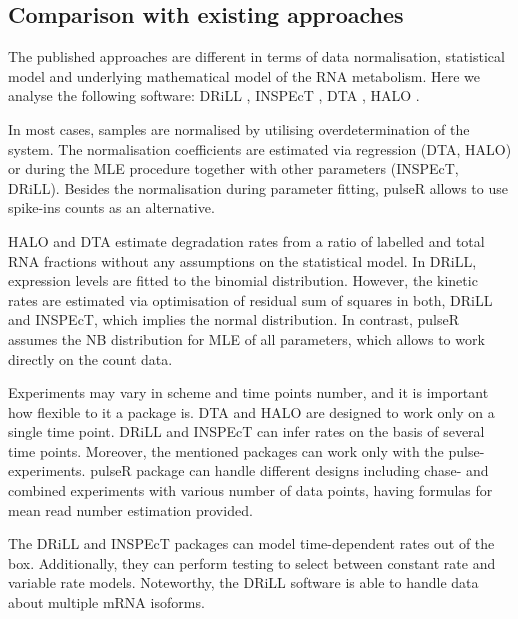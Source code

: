 \subsection{Comparison with existing approaches}
The published approaches are different in terms of 
data normalisation, statistical model and underlying mathematical model of the 
RNA metabolism. Here we analyse the following software:
DRiLL \citep{rabani2014high},
INSPEcT \citep{de2015inspect},
DTA \citep{schwalb2012measurement},
HALO \citep{friedel2010halo}.
\par 
In most cases, samples are normalised by utilising overdetermination of the system.
The normalisation coefficients are estimated via regression
(DTA, HALO) or during the MLE procedure together  
with other parameters (INSPEcT, DRiLL). 
Besides the normalisation during parameter fitting, 
pulseR allows to use spike-ins counts as an alternative.
\par
HALO and DTA estimate degradation rates from a ratio of labelled and
total RNA fractions without any assumptions on the statistical model.
In DRiLL, expression levels are fitted to the binomial distribution. 
However, the kinetic rates are estimated via
optimisation of residual sum of squares in both, DRiLL and 
INSPEcT,
which implies the normal distribution. 
In contrast,  pulseR assumes the NB distribution
for MLE of  all  parameters,
which allows to work directly on the count data.
\par
Experiments may vary in scheme and time points number,
and it is important how flexible to it a package is.
 DTA and HALO are designed to work only on a single time
point. DRiLL and INSPEcT can infer rates on the basis of several time points.
Moreover, the mentioned packages can work only with  the pulse-experiments.
pulseR package can handle different designs including chase- and combined 
experiments with various number of data points,
having formulas for mean read number estimation provided.	
\par 
The DRiLL and INSPEcT packages can model 
time-dependent rates out of the box. Additionally, they can perform testing
to select between constant rate and variable rate models.
Noteworthy, the DRiLL software is able to handle data about multiple mRNA isoforms.
